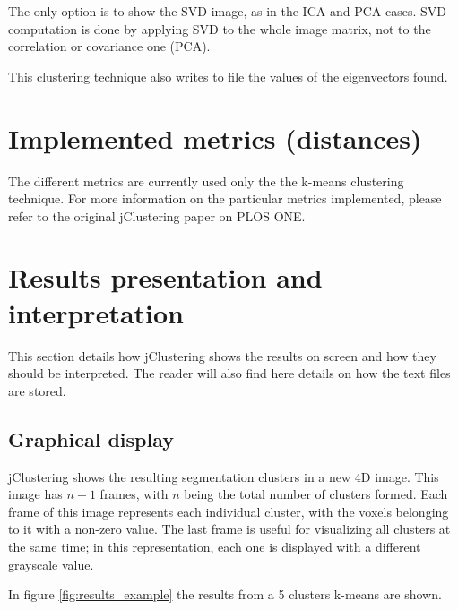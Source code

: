 \documentclass[11pt]{article} %
\begin{document}
The only option is to show the SVD image, as in the ICA and PCA cases. SVD computation is done by applying SVD to the
whole image matrix, not to the correlation or covariance one (PCA).

This clustering technique also writes to file the values of the eigenvectors found.

\section{Implemented metrics (distances)}
\label{sec:metrics}

The different metrics are currently used only the the k-means clustering technique. For more information on the 
particular metrics implemented, please refer to the original jClustering paper on PLOS ONE.

\section{Results presentation and interpretation}
\label{sec:results}

This section details how jClustering shows the results on screen and how they should be interpreted. The reader will also
find here details on how the text files are stored.

\subsection{Graphical display}
\label{subsec:results_graphical}

jClustering shows the resulting segmentation clusters in a new 4D image. This image has $n+1$ frames, with $n$ being the
total number of clusters formed. Each frame of this image represents each individual cluster, with the voxels belonging to it
with a non-zero value. The last frame is useful for visualizing all clusters at the same time; in this representation, each one is 
displayed with a different grayscale value.

In figure \ref{fig:results_example} the results from a 5 clusters k-means are shown.
\end{document}
